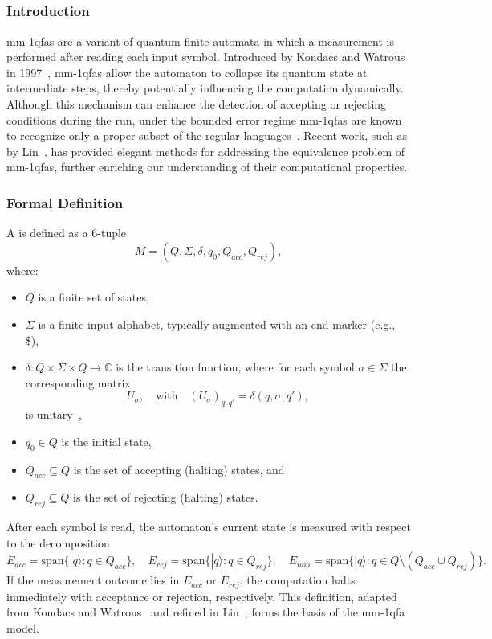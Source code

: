 \subsection{}
\label{sec:mmqfa}

\subsubsection{Introduction}
\glspl{mm-1qfa} are a variant of quantum finite automata in which a measurement is performed after reading each input symbol. Introduced by Kondacs and Watrous in 1997~\cite{646094}, \gls{mm-1qfa}s allow the automaton to collapse its quantum state at intermediate steps, thereby potentially influencing the computation dynamically. Although this mechanism can enhance the detection of accepting or rejecting conditions during the run, under the bounded error regime \gls{mm-1qfa}s are known to recognize only a proper subset of the regular languages~\cite{brodsky2002characterizations}. Recent work, such as by Lin~\cite{LIN2012807}, has provided elegant methods for addressing the equivalence problem of \gls{mm-1qfa}s, further enriching our understanding of their computational properties.

\subsubsection{Formal Definition}
A  is defined as a 6-tuple
\[
M = (Q,\Sigma,\delta,q_0,Q_{acc},Q_{rej}),
\]
where:
\begin{itemize}
    \item $Q$ is a finite set of states,
    \item $\Sigma$ is a finite input alphabet, typically augmented with an end-marker (e.g., \$),
    \item $\delta : Q \times \Sigma \times Q \to \mathbb{C}$ is the transition function, where for each symbol $\sigma\in\Sigma$ the corresponding matrix 
    \[
    U_\sigma,\quad \text{with} \quad (U_\sigma)_{q,q'}=\delta(q,\sigma,q'),
    \]
    is unitary~\cite{646094},
    \item $q_0 \in Q$ is the initial state,
    \item $Q_{acc} \subseteq Q$ is the set of accepting (halting) states, and
    \item $Q_{rej} \subseteq Q$ is the set of rejecting (halting) states.
\end{itemize}
After each symbol is read, the automaton's current state is measured with respect to the decomposition
\[
E_{acc} = \text{span}\{|q\rangle : q \in Q_{acc}\},\quad
E_{rej} = \text{span}\{|q\rangle : q \in Q_{rej}\},\quad
E_{non} = \text{span}\{|q\rangle : q \in Q \setminus (Q_{acc}\cup Q_{rej})\}.
\]
If the measurement outcome lies in $E_{acc}$ or $E_{rej}$, the computation halts immediately with acceptance or rejection, respectively. This definition, adapted from Kondacs and Watrous~\cite{646094} and refined in Lin~\cite{LIN2012807}, forms the basis of the \gls{mm-1qfa} model.

